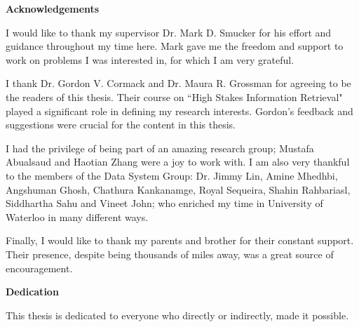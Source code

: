\cleardoublepage


\begin{center}\textbf{Acknowledgements}\end{center}

I would like to thank my supervisor Dr. Mark D. Smucker for his effort and guidance
throughout my time here. Mark gave me the freedom and support to work on
problems I was interested in, for which I am very grateful.

I thank Dr. Gordon V. Cormack and Dr. Maura R. Grossman for agreeing to be the readers
of this thesis. Their course on ``High Stakes Information Retrieval" played a
significant role in defining my research interests. Gordon's feedback and
suggestions were crucial for the content in this thesis.

I had the privilege of being part of an amazing research group; Mustafa
Abualsaud and Haotian Zhang were a joy to work with. I am also very thankful to
the members of the Data System Group: Dr. Jimmy Lin, Amine Mhedhbi, Angshuman
Ghosh, Chathura Kankanamge, Royal Sequeira, Shahin Rahbariasl, Siddhartha Sahu
and Vineet John; who enriched my time in University of Waterloo in many
different ways.

Finally, I would like to thank my parents and brother for their constant
support. Their presence, despite being thousands of miles away, was a great
source of encouragement.

\cleardoublepage


\begin{center}\textbf{Dedication}\end{center}

\centerline{This thesis is dedicated to everyone who directly or indirectly, made
it possible.}

\cleardoublepage

\renewcommand\contentsname{Table of Contents}
\tableofcontents
\cleardoublepage
{}    %

\listoftables
\cleardoublepage
{}		%

\listoffigures
\cleardoublepage
{}		%



